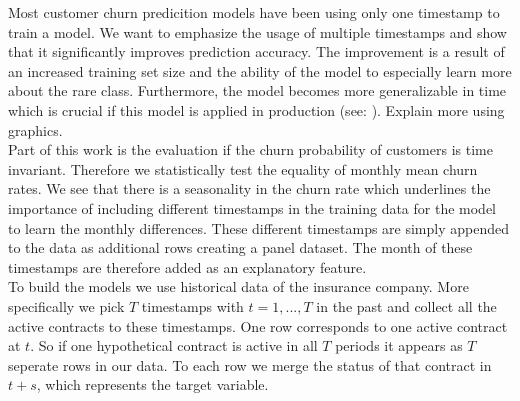 \documentclass[12pt,titlepage]{article}
\begin{document}
Most customer churn predicition models have been using only one timestamp to train a model. We want to emphasize the usage of multiple timestamps and show that it significantly improves prediction accuracy. The improvement is a result of an increased training set size and the ability of the model to especially learn more about the rare class. Furthermore, the model becomes more generalizable in time which is crucial if this model is applied in
production (see: \cite{multiplets}). Explain more using graphics.\\
Part of this work is the evaluation if the churn probability of customers is time invariant. Therefore we statistically test the equality of monthly mean churn rates. We see that there is a seasonality in the churn rate which underlines the
importance of including different timestamps in the training data for the model to learn the monthly differences. These different timestamps are simply appended to the data as additional rows creating a panel dataset. The month of these timestamps are therefore added as an explanatory feature. \\
To build the models we use historical data of the insurance company. More specifically we pick $T$ timestamps with
$t = 1,...,T$ in the past and collect all the active contracts to these timestamps. One row corresponds to one active contract at $t$. So if one hypothetical contract is active in all $T$ periods it appears as $T$ seperate rows in our data. To each row we merge the status of that contract in $t+s$, which represents the target variable. \\
\end{document}
